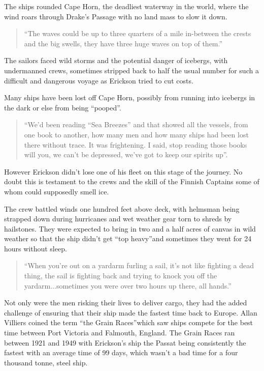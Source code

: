 \documentclass[
  11pt,
  msmallroyalvopaper
]{memoir}
\begin{document}
The ships rounded Cape Horn, the deadliest waterway in the world, where
the wind roars through Drake’s Passage with no land mass to slow it
down.

\begin{quote}
“The waves could be up to three quarters of a mile in-between the crests
and the big swells, they have three huge waves on top of them.”
\end{quote}

The sailors faced wild storms and the potential danger of icebergs, with
undermanned crews, sometimes stripped back to half the usual number for
such a difficult and dangerous voyage as Erickson tried to cut costs.

Many ships have been lost off Cape Horn, possibly from running into
icebergs in the dark or else from being “pooped”.

\begin{quote}
“We’d been reading “Sea Breezes” and that showed all the vessels, from
one book to another, how many men and how many ships had been lost there
without trace. It was frightening. I said, stop reading those books will
you, we can’t be depressed, we’ve got to keep our spirits up”.
\end{quote}

However Erickson didn’t lose one of his fleet on this stage of the
journey. No doubt this is testament to the crews and the skill of the
Finnish Captains some of whom could supposedly smell ice.

The crew battled winds one hundred feet above deck, with helmsman being
strapped down during hurricanes and wet weather gear torn to shreds by
hailstones. They were expected to bring in two and a half acres of
canvas in wild weather so that the ship didn’t get “top heavy”and
sometimes they went for 24 hours without sleep.

\begin{quote}
“When you’re out on a yardarm furling a sail, it’s not like fighting a
dead thing, the sail is fighting back and trying to knock you off the
yardarm...sometimes you were over two hours up there, all hands.”
\end{quote}

Not only were the men risking their lives to deliver cargo, they had the
added challenge of ensuring that their ship made the fastest time back
to Europe. Allan Villiers coined the term “the Grain Races”which saw
ships compete for the best time between Port Victoria and Falmouth,
England. The Grain Races ran between 1921 and 1949 with Erickson’s ship
the Passat being consistently the fastest with an average time of 99
days, which wasn’t a bad time for a four thousand tonne, steel ship.
\end{document}
